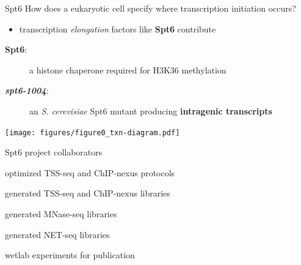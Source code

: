\documentclass[aspectratio=169]{beamer}
\begin{document}
\begin{frame}{Spt6}
    How does a eukaryotic cell specify where transcription initiation occurs?
    \begin{itemize}
        \item transcription \textit{elongation} factors like \textbf{Spt6} contribute
    \end{itemize}

    \begin{description}
        \item [\textbf{Spt6}:] a histone chaperone required for H3K36 methylation
        \item [\textbf{\textit{spt6-1004}}:] an \textit{S. cerevisiae} Spt6 mutant producing \textbf{intragenic transcripts}
    \end{description}
    \vspace{1em}

    \centering
    \texttt{[image: figures/figure0\_txn-diagram.pdf]}
\end{frame}

\begin{frame}{Spt6 project collaborators}
    \begin{description}
        \item [Steve Doris] optimized TSS-seq and ChIP-nexus protocols
        \item [] generated TSS-seq and ChIP-nexus libraries
        \item [Olga Viktorovskaya] generated MNase-seq libraries
        \item [Magdalenda Murawska] generated NET-seq libraries
        \item [Dan Spatt] wetlab experiments for publication
    \end{description}
\end{frame}



\begin{frame}
\end{frame}
\end{document}
